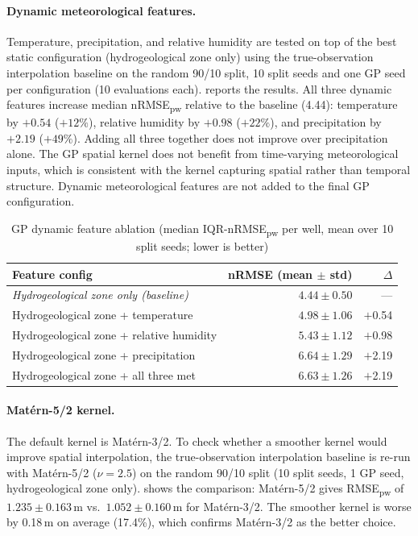 \paragraph{Dynamic meteorological features.}
Temperature, precipitation, and relative humidity are tested on top of the best
static configuration (hydrogeological zone only) using the true-observation interpolation baseline on the random 90/10 split,
10 split seeds and one GP seed per configuration (10 evaluations each). 
reports the results.
All three dynamic features increase median nRMSE\textsubscript{pw} relative to the baseline
(4.44): temperature by $+0.54$ ($+12\%$), relative humidity by $+0.98$ ($+22\%$), and
precipitation by $+2.19$ ($+49\%$). Adding all three together does not improve over
precipitation alone. The GP spatial kernel does not benefit from time-varying meteorological
inputs, which is consistent with the kernel capturing spatial rather than temporal structure.
Dynamic meteorological features are not added to the final GP configuration.

\begin{table}[htbp]
\centering
\begin{tabular}{lrr}
\toprule
\textbf{Feature config}             & \textbf{nRMSE (mean $\pm$ std)} & \textbf{$\Delta$} \\
\midrule
\textit{Hydrogeological zone only (baseline)}  & $4.44 \pm 0.50$                 & ---       \\
Hydrogeological zone + temperature            & $4.98 \pm 1.06$                 & $+$0.54   \\
Hydrogeological zone + relative humidity      & $5.43 \pm 1.12$                 & $+$0.98   \\
Hydrogeological zone + precipitation          & $6.64 \pm 1.29$                 & $+$2.19   \\
Hydrogeological zone + all three met          & $6.63 \pm 1.26$                 & $+$2.19   \\
\bottomrule
\end{tabular}
\caption{GP dynamic feature ablation (median IQR-nRMSE\textsubscript{pw} per well, mean over 10 split seeds; lower is better)}
\label{tab:gp_ablation_dynamic}
\end{table}

\paragraph{Matérn-5/2 kernel.}
The default kernel is Matérn-3/2. To check whether a smoother kernel would improve spatial interpolation, the true-observation interpolation baseline is re-run with Matérn-5/2 ($\nu=2.5$) on the random 90/10 split (10 split seeds, 1 GP seed, hydrogeological zone only).  shows the comparison: Matérn-5/2 gives RMSE\textsubscript{pw} of $1.235 \pm 0.163$\,m vs.\ $1.052 \pm 0.160$\,m for Matérn-3/2. The smoother kernel is worse by 0.18\,m on average (17.4\%), which confirms Matérn-3/2 as the better choice.

